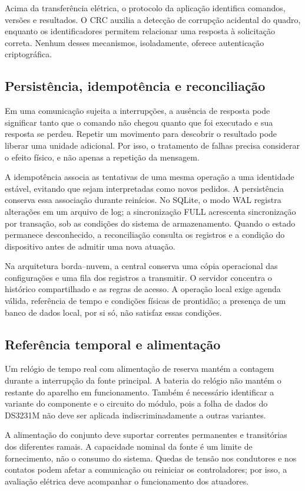 Acima da transferência elétrica, o protocolo da aplicação identifica comandos, versões e resultados. O CRC auxilia a detecção de corrupção acidental do quadro, enquanto os identificadores permitem relacionar uma resposta à solicitação correta. Nenhum desses mecanismos, isoladamente, oferece autenticação criptográfica.

\subsection{Persistência, idempotência e reconciliação}
Em uma comunicação sujeita a interrupções, a ausência de resposta pode significar tanto que o comando não chegou quanto que foi executado e sua resposta se perdeu. Repetir um movimento para descobrir o resultado pode liberar uma unidade adicional. Por isso, o tratamento de falhas precisa considerar o efeito físico, e não apenas a repetição da mensagem.

A idempotência associa as tentativas de uma mesma operação a uma identidade estável, evitando que sejam interpretadas como novos pedidos. A persistência conserva essa associação durante reinícios. No SQLite, o modo WAL registra alterações em um arquivo de log; a sincronização FULL acrescenta sincronização por transação, sob as condições do sistema de armazenamento. \cite{SQLITE_PRAGMA} Quando o estado permanece desconhecido, a reconciliação consulta os registros e a condição do dispositivo antes de admitir uma nova atuação.

Na arquitetura borda--nuvem, a central conserva uma cópia operacional das configurações e uma fila dos registros a transmitir. O servidor concentra o histórico compartilhado e as regras de acesso. A operação local exige agenda válida, referência de tempo e condições físicas de prontidão; a presença de um banco de dados local, por si só, não satisfaz essas condições.

\subsection{Referência temporal e alimentação}
Um relógio de tempo real com alimentação de reserva mantém a contagem durante a interrupção da fonte principal. A bateria do relógio não mantém o restante do aparelho em funcionamento. Também é necessário identificar a variante do componente e o circuito do módulo, pois a folha de dados do DS3231M não deve ser aplicada indiscriminadamente a outras variantes. \cite{ADI_DS3231M}

A alimentação do conjunto deve suportar correntes permanentes e transitórias dos diferentes ramais. A capacidade nominal da fonte é um limite de fornecimento, não o consumo do sistema. Quedas de tensão nos condutores e nos contatos podem afetar a comunicação ou reiniciar os controladores; por isso, a avaliação elétrica deve acompanhar o funcionamento dos atuadores.

